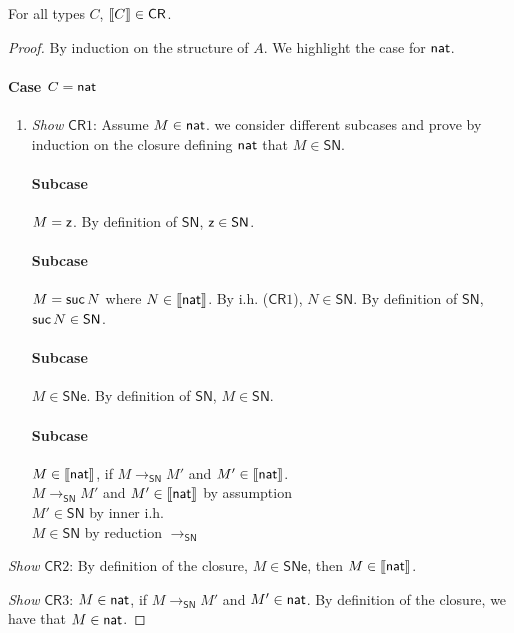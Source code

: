 \documentclass{article}
\newcommand{\SN}{\mathsf{SN}}
\newcommand{\SNe}{\mathsf{SNe}}
\newcommand{\CR}{\textsf{CR}}
\newcommand{\redSN}{\longrightarrow_\SN}
\def\lv{\mathopen{{[\kern-0.14em[}}}    %
\def\rv{\mathclose{{]\kern-0.14em]}}}   %
\newcommand{\den}[1]{\lv #1 \rv}
\begin{document}
\begin{theorem}
For all types $C$, $\den{C}  \in \CR$.
\end{theorem}
\begin{proof}
By induction on the structure of $A$. We highlight the case for $\mathsf{nat}$.

\paragraph{Case $C = \mathsf{nat}$}

\begin{enumerate}
\item \textit{Show} $\CR1$: Assume $M \in \mathsf{nat}$. we consider different subcases
  and prove by induction on the closure defining $\mathsf{nat}$ that $M \in \SN$.
%

\paragraph{Subcase } $M = \mathsf{z}$. By definition of $\SN$, $\zero \in \SN$.

\paragraph{Subcase } $M = {\mathsf{suc}}\, N$ where $N \in \den{\nat}$.  By i.h. ($\CR1$),
$N \in \SN$. By definition of $\SN$, $\suc N \in \SN$.

 \paragraph{Subcase} $M \in \SNe$. By definition of $\SN$, $M \in \SN$.

 \paragraph{Subcase} $M \in \den{\nat}$, if $M \redSN M'$ and $M' \in \den{\nat}$. 
 \\
 $M \redSN M'$ and $M' \in \den{\nat}$ \hfill by assumption \\
 $M' \in \SN$ \hfill by inner i.h. \\
 $M \in \SN$ \hfill by reduction $\redSN$
 \end{enumerate}


 \item \textit{Show} $\CR2$: By definition of the closure, $M \in \SNe$, then $M
   \in \den{\nat}$. 

 \item \textit{Show} $\CR3$: $M \in \mathsf{nat}$, if $M \redSN M'$ and $M' \in \mathsf{nat}$. By
   definition of the closure, we have that $M \in \mathsf{nat}$.
 \end{proof}
\end{document}
